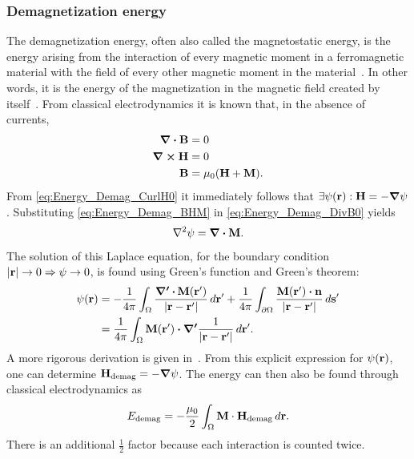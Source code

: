 \documentclass[11pt,a4paper,english,twoside]{article}
\begin{document}
\subsubsection{Demagnetization energy}
The demagnetization energy, often also called the magnetostatic energy, is the energy arising from the interaction of every magnetic moment in a ferromagnetic material with the field of every other magnetic moment in the material~\cite{NML_Carlton}. In other words, it is the energy of the magnetization in the magnetic field created by itself~\cite{abert2013discrete}.
From classical electrodynamics it is known that, in the absence of currents,
\begin{align}
	\div{\vb{B}} &= 0 \label{eq:Energy_Demag_DivB0} \\
	\curl{\vb{H}} &= 0 \label{eq:Energy_Demag_CurlH0} \\
	\vb{B} &= \mu_0 (\vb{H} + \vb{M}) \label{eq:Energy_Demag_BHM} \mathrm{.}
\end{align}
From \cref{eq:Energy_Demag_CurlH0} it immediately follows that $\exists \psi(\vb{r}): \vb{H} = -\gradient{\psi}$. Substituting \cref{eq:Energy_Demag_BHM} in \cref{eq:Energy_Demag_DivB0} yields
\begin{equation}
    \laplacian{\psi} = \div{\vb{M}} \mathrm{.}
\end{equation}
The solution of this Laplace equation, for the boundary condition $\abs{\vb{r}} \rightarrow 0 \Rightarrow \psi \rightarrow 0$, is found using Green's function and Green's theorem:
\begin{align*}
    \psi(\vb{r}) &= -\frac{1}{4\pi}\int_\Omega \frac{\boldsymbol{\nabla'\,\vdot}\,\vb{M}(\vb{r'})}{\abs{\vb{r}-\vb{r'}}} \,d\vb{r'} + \frac{1}{4\pi}\int_{\partial\Omega} \frac{\vb{M}(\vb{r'}) \vdot \vb{n}}{\abs{\vb{r}-\vb{r'}}} \,d\vb{s'} \\
    &= \frac{1}{4\pi}\int_\Omega \vb{M}(\vb{r'}) \vdot \boldsymbol{\nabla'} \frac{1}{\abs{\vb{r}-\vb{r'}}} \,d\vb{r'} \mathrm{.}
\end{align*}
A more rigorous derivation is given in~\cite{abert2013discrete}.
From this explicit expression for $\psi(\vb{r})$, one can determine $\vb{H_\mathrm{demag}} = -\gradient{\psi}$. The energy can then also be found through classical electrodynamics as
\begin{equation}
    E_\mathrm{demag} = -\frac{\mu_0}{2} \int_\Omega \vb{M} \cdot \vb{H_\mathrm{demag}} \, d\vb{r} \mathrm{.} \label{eq:Energy_Term_Demag}
\end{equation}
There is an additional $\frac{1}{2}$ factor because each interaction is counted twice.
\end{document}

